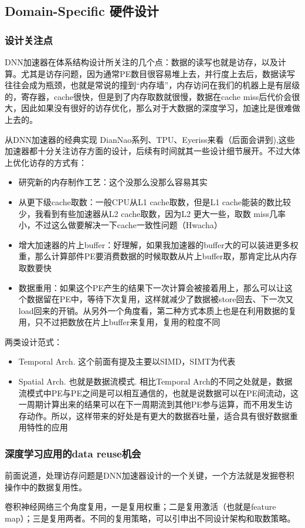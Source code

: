 \documentclass[12pt]{article}
\begin{document}
\subsection{Domain-Specific 硬件设计}
\subsubsection{设计关注点}
DNN加速器在体系结构设计所关注的几个点：数据的读写也就是访存，以及计算。尤其是访存问题，因为通常PE数目很容易堆上去，并行度上去后，数据读写往往会成为瓶颈，也就是常说的撞到“内存墙”，内存访问在我们的机器上是有层级的，寄存器，cache很快，但是到了内存取数就很慢，数据在cache miss后代价会很大，因此如果没有很好的访存优化，那么对于大数据的深度学习，加速比是很难做上去的。

从DNN加速器的经典实现 DianNao系列、TPU、Eyeriss来看（后面会讲到),这些加速器都十分关注访存方面的设计，后续有时间就其一些设计细节展开。不过大体上优化访存的方式有：
\begin{itemize}
\setlength{\itemsep}{0pt}
\setlength{\parsep}{0pt}
\setlength{\parskip}{0pt}
    \item 研究新的内存制作工艺：这个没那么没那么容易其实
    \item 从更下级cache取数：一般CPU从L1 cache取数，但是L1 cache能装的数比较少，我看到有些加速器从L2 cache取数，因为L2 更大一些，取数 miss几率小，不过这么做要解决一下cache一致性问题（Hwacha）
    \item 增大加速器的片上buffer：好理解，如果我加速器的buffer大的可以装进更多权重，那么计算部件PE要消费数据的时候取数从片上buffer取，那肯定比从内存取数要快
    \item 数据重用：如果这个PE产生的结果下一次计算会被接着用上，那么可以让这个数据留在PE中，等待下次复用，这样就减少了数据被store回去、下一次又load回来的开销。从另外一个角度看，第二种方式本质上也是在利用数据的复用，只不过把数放在片上buffer来复用，复用的粒度不同
\end{itemize}

两类设计范式：
\begin{itemize}
\setlength{\itemsep}{0pt}
\setlength{\parsep}{0pt}
\setlength{\parskip}{0pt}
    \item Temporal Arch. 这个前面有提及主要以SIMD，SIMT为代表
    \item Spatial Arch. 也就是数据流模式. 相比Temporal Arch的不同之处就是，数据流模式中PE与PE之间是可以相互通信的，也就是说数据可以在PE间流动，这一周期计算出来的结果可以在下一周期流到其他PE参与运算，而不用发生访存动作。所以，这样带来的好处是有更大的数据吞吐量，适合具有很好数据重用特性的应用
\end{itemize}

\subsubsection{深度学习应用的data reuse机会}
前面说道，处理访存问题是DNN加速器设计的一个关键，一个方法就是发掘卷积操作中的数据复用性。

卷积神经网络三个角度复用，一是复用权重；二是复用激活（也就是feature map）；三是复用两者。不同的复用策略，可以引申出不同设计架构和取数策略。





\end{document}
